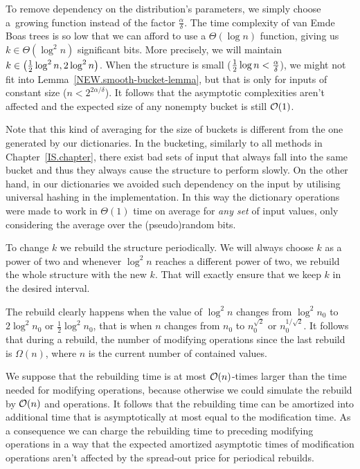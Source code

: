 To remove dependency on the distribution's parameters, we simply choose a~growing function instead of the factor $\frac \alpha \delta$.
The time complexity of van Emde Boas trees is so low that we can afford to use a $\Theta(\log n)$ function, giving us $k \in \Theta(\log^2 n)$ significant bits.
More precisely, we will maintain $k \in \left(\frac 1 2 \log^2 n,2 \log^2 n\right)$.
When the structure is small ($\frac 1 2 \log n < \frac \alpha \delta$), we might not fit into Lemma~\ref{NEW.smooth-bucket-lemma}, but that is only for inputs of constant size ($n < 2^{2 \alpha / \delta}$). It follows that the asymptotic complexities aren't affected and the expected size of any nonempty bucket is still $\mathcal O(1)$.

Note that this kind of averaging for the size of buckets is different from the one generated by our dictionaries. In the bucketing, similarly to all methods in Chapter~\ref{IS.chapter}, there exist bad sets of input that always fall into the same bucket and thus they always cause the structure to perform slowly.
On the other hand, in our dictionaries we avoided such dependency on the input by utilising universal hashing in the implementation. In this way the dictionary operations were made to work in $\Theta(1)$ time on average for \emph{any set} of input values, only considering the average over the (pseudo)random bits.

To change $k$ we rebuild the structure periodically. We will always choose $k$ as a power of two and whenever $\log^2 n$ reaches a different power of two, we rebuild the whole structure with the new $k$. That will exactly ensure that we keep $k$ in the desired interval.

The rebuild clearly happens when the value of $\log^2 n$ changes from $\log^2 n_0$ to $2 \log^2 n_0$ or $\frac 1 2 \log^2 n_0$, that is when $n$ changes from $n_0$ to $n_0^{\sqrt 2}$ or $n_0^{1 / \sqrt 2}$.
It follows that during a rebuild, the number of modifying operations since the last rebuild is $\Omega(n)$, where $n$ is the current number of contained values.

We suppose that the rebuilding time is at most $\mathcal O(n)$-times larger than the time needed for modifying operations, because otherwise we could simulate the rebuild by $\mathcal O(n)$  and  operations.
It follows that the rebuilding time can be amortized into additional time that is asymptotically at most equal to the modification time.
As a consequence we can charge the rebuilding time to preceding modifying operations in a way that the expected amortized asymptotic times of modification operations aren't affected by the spread-out price for periodical rebuilds.
